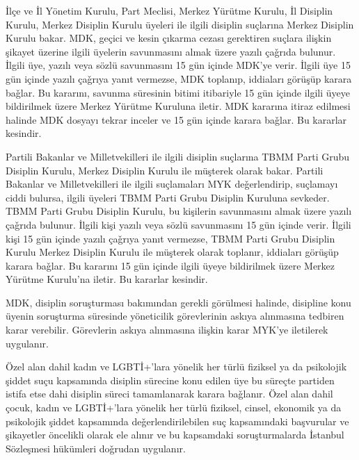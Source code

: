 \documentclass[11pt]{article} %
\begin{document}
İlçe ve İl Yönetim Kurulu, Part Meclisi, Merkez Yürütme Kurulu, İl Disiplin Kurulu, Merkez Disiplin Kurulu üyeleri ile ilgili disiplin suçlarına Merkez Disiplin Kurulu bakar. MDK, geçici ve kesin çıkarma cezası gerektiren suçlara ilişkin şikayet üzerine ilgili üyelerin savunmasını almak üzere yazılı çaǧrıda bulunur. İlgili üye, yazılı veya sözlü savunmasını 15 gün içinde MDK’ye verir. İlgili üye 15 gün içinde yazılı çaǧrıya yanıt vermezse, MDK toplanıp, iddiaları görüşüp karara baǧlar. Bu kararını, savunma süresinin bitimi itibariyle 15 gün içinde ilgili üyeye bildirilmek üzere Merkez Yürütme Kuruluna iletir. MDK kararına itiraz edilmesi halinde MDK dosyayı tekrar inceler ve 15 gün içinde karara baǧlar. Bu kararlar kesindir.

Partili Bakanlar ve Milletvekilleri ile ilgili disiplin suçlarına TBMM Parti Grubu Disiplin Kurulu, Merkez Disiplin Kurulu ile müşterek olarak bakar. Partili Bakanlar ve Milletvekilleri ile ilgili suçlamaları MYK deǧerlendirip, suçlamayı ciddi bulursa, ilgili üyeleri TBMM Parti Grubu Disiplin Kuruluna sevkeder. TBMM Parti Grubu Disiplin Kurulu, bu kişilerin savunmasını almak üzere yazılı çaǧrıda bulunur. İlgili kişi yazılı veya sözlü savunmasını 15 gün içinde verir. İlgili kişi 15 gün içinde yazılı çaǧrıya yanıt vermezse, TBMM Parti Grubu Disiplin Kurulu Merkez Disiplin Kurulu ile müşterek olarak toplanır, iddiaları görüşüp karara baǧlar. Bu kararını 15 gün içinde ilgili üyeye bildirilmek üzere Merkez Yürütme Kurulu’na iletir. Bu kararlar kesindir.

MDK, disiplin soruşturması bakımından gerekli görülmesi halinde, disipline konu üyenin soruşturma süresinde yöneticilik görevlerinin askıya alınmasına tedbiren karar verebilir. Görevlerin askıya alınmasına ilişkin karar MYK’ye iletilerek uygulanır.

Özel alan dahil kadın ve LGBTİ+’lara yönelik her türlü fiziksel ya da psikolojik şiddet suçu kapsamında disiplin sürecine konu edilen üye bu süreçte partiden istifa etse dahi disiplin süreci tamamlanarak karara baǧlanır. Özel alan dahil çocuk, kadın ve LGBTİ+’lara yönelik her türlü fiziksel, cinsel, ekonomik ya da psikolojik şiddet kapsamında deǧerlendirilebilen suç kapsamındaki başvurular ve şikayetler öncelikli olarak ele alınır ve bu kapsamdaki soruşturmalarda İstanbul Sözleşmesi hükümleri doǧrudan uygulanır.
\end{document}
